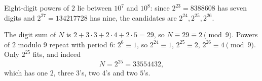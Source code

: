 Eight-digit powers of $2$ lie between $10^7$ and $10^8$: since $2^{23}=8388608$ has seven digits and $2^{27}=134217728$ has nine, the candidates are $2^{24},2^{25},2^{26}$.

The digit sum of $N$ is $2+3\cdot3+2\cdot4+2\cdot5=29$, so $N\equiv29\equiv2\pmod9$. Powers of $2$ modulo $9$ repeat with period $6$: $2^6\equiv1$, so $2^{24}\equiv1$, $2^{25}\equiv2$, $2^{26}\equiv4\pmod9$. Only $2^{25}$ fits, and indeed
\[
N=2^{25}=\boxed{33554432},
\]
which has one $2$, three $3$'s, two $4$'s and two $5$'s.
